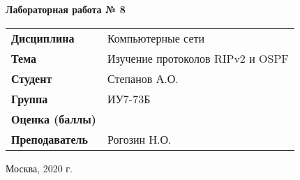 \begin{center}
    \textbf{Лабораторная работа № 8} \\
    \vspace{0.5cm}
\end{center}

\vspace{4cm}

\begin{flushleft}
    \begin{tabular}{ll}
        \textbf{Дисциплина} & Компьютерные сети \\
        \textbf{Тема} & Изучение протоколов RIPv2 и OSPF \\
        \textbf{Студент} & Степанов А.О. \\
        \textbf{Группа} & ИУ7-73Б \\
        \textbf{Оценка (баллы)} & \\
        \textbf{Преподаватель} & Рогозин Н.О. \\
    \end{tabular}
\end{flushleft}

\vspace{4cm}

\begin{center}
    Москва, 2020 г.
\end{center}
